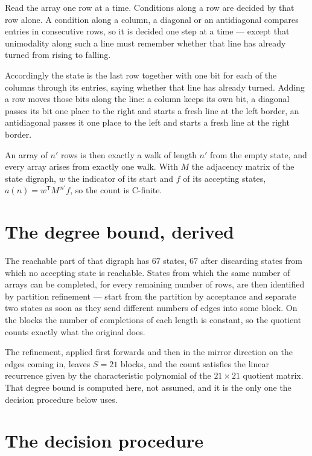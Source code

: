 \documentclass[11pt]{article}
\theoremstyle{definition}
\begin{document}
Read the array one row at a time. Conditions along a row are decided by that row alone. A condition along a column, a diagonal or an antidiagonal compares entries in consecutive rows, so it is decided one step at a time --- except that unimodality along such a line must remember whether that line has already turned from rising to falling.

Accordingly the state is the last row together with one bit for each of the columns through its entries, saying whether that line has already turned. Adding a row moves those bits along the line: a column keeps its own bit, a diagonal passes its bit one place to the right and starts a fresh line at the left border, an antidiagonal passes it one place to the left and starts a fresh line at the right border.

An array of $n'$ rows is then exactly a walk of length $n'$ from the empty state, and every array arises from exactly one walk. With $M$ the adjacency matrix of the state digraph, $w$ the indicator of its start and $f$ of its accepting states, $a(n) = w^{\mathsf T}M^{\,n'}f$, so the count is C-finite.

\section{The degree bound, derived}

The reachable part of that digraph has $67$ states, $67$ after discarding states from which no accepting state is reachable. States from which the same number of arrays can be completed, for every remaining number of rows, are then identified by partition refinement --- start from the partition by acceptance and separate two states as soon as they send different numbers of edges into some block. On the blocks the number of completions of each length is constant, so the quotient counts exactly what the original does.

The refinement, applied first forwards and then in the mirror direction on the edges coming in, leaves $S = 21$ blocks, and the count satisfies the linear recurrence given by the characteristic polynomial of the $21 \times 21$ quotient matrix. That degree bound is computed here, not assumed, and it is the only one the decision procedure below uses.

\section{The decision procedure}
\end{document}
